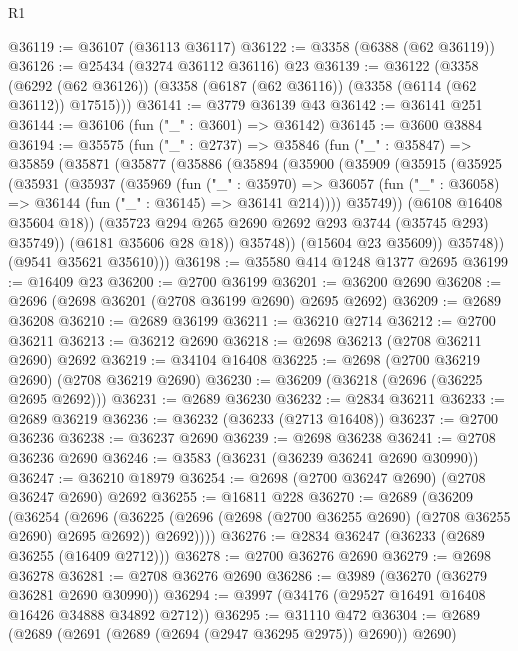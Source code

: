 \begin{lexlean}{R1}
\begin{coremodule}
@36119 := @36107 (@36113 @36117)
@36122 := @3358 (@6388 (@62 @36119))
@36126 := @25434 (@3274 @36112 @36116) @23
@36139 := @36122
    (@3358 (@6292 (@62 @36126)) (@3358 (@6187 (@62 @36116)) (@3358 (@6114 (@62 @36112)) @17515)))
@36141 := @3779 @36139 @43
@36142 := @36141 @251
@36144 := @36106 (fun ("_" : @3601) => @36142)
@36145 := @3600 @3884
@36194 := @35575
    (fun ("_" : @2737) =>
    @35846
      (fun ("_" : @35847) =>
      @35859
        (@35871
          (@35877
            (@35886
              (@35894
                (@35900
                  (@35909
                    (@35915
                      (@35925
                        (@35931
                          (@35937
                            (@35969
                              (fun ("_" : @35970) =>
                              @36057
                                (fun ("_" : @36058) => @36144 (fun ("_" : @36145) => @36141 @214))))
                            @35749))
                        (@6108 @16408 @35604 @18))
                      (@35723 @294 @265 @2690 @2692 @293 @3744 (@35745 @293) @35749))
                    (@6181 @35606 @28 @18))
                  @35748))
              (@15604 @23 @35609))
            @35748))
        (@9541 @35621 @35610)))
@36198 := @35580 @414 @1248 @1377 @2695
@36199 := @16409 @23
@36200 := @2700 @36199
@36201 := @36200 @2690
@36208 := @2696 (@2698 @36201 (@2708 @36199 @2690) @2695 @2692)
@36209 := @2689 @36208
@36210 := @2689 @36199
@36211 := @36210 @2714
@36212 := @2700 @36211
@36213 := @36212 @2690
@36218 := @2698 @36213 (@2708 @36211 @2690) @2692
@36219 := @34104 @16408
@36225 := @2698 (@2700 @36219 @2690) (@2708 @36219 @2690)
@36230 := @36209 (@36218 (@2696 (@36225 @2695 @2692)))
@36231 := @2689 @36230
@36232 := @2834 @36211
@36233 := @2689 @36219
@36236 := @36232 (@36233 (@2713 @16408))
@36237 := @2700 @36236
@36238 := @36237 @2690
@36239 := @2698 @36238
@36241 := @2708 @36236 @2690
@36246 := @3583 (@36231 (@36239 @36241 @2690 @30990))
@36247 := @36210 @18979
@36254 := @2698 (@2700 @36247 @2690) (@2708 @36247 @2690) @2692
@36255 := @16811 @228
@36270 := @2689
    (@36209
      (@36254
        (@2696
          (@36225 (@2696 (@2698 (@2700 @36255 @2690) (@2708 @36255 @2690) @2695 @2692)) @2692))))
@36276 := @2834 @36247 (@36233 (@2689 @36255 (@16409 @2712)))
@36278 := @2700 @36276 @2690
@36279 := @2698 @36278
@36281 := @2708 @36276 @2690
@36286 := @3989 (@36270 (@36279 @36281 @2690 @30990))
@36294 := @3997 (@34176 (@29527 @16491 @16408 @16426 @34888 @34892 @2712))
@36295 := @31110 @472
@36304 := @2689 (@2689 (@2691 (@2689 (@2694 (@2947 @36295 @2975)) @2690)) @2690)

\end{coremodule}
\end{lexlean}
